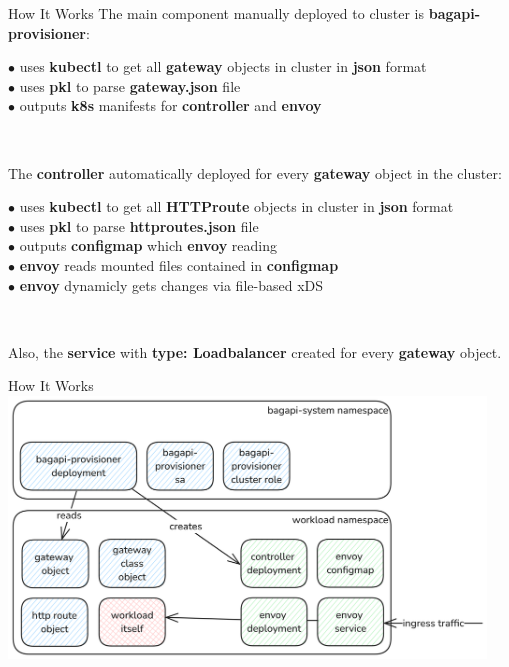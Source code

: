 \documentclass[11pt, aspectratio=169]{beamer}
\begin{document}
\begin{frame}{ How It Works}
	The main component manually deployed to cluster is \textbf{bagapi-provisioner}:

	\begin{description}
		\item [$\bullet$ uses \textbf{kubectl} to get all \textbf{gateway} objects in cluster in \textbf{json} format]
		\item [$\bullet$ uses \textbf{pkl} to parse \textbf{gateway.json} file]
		\item [$\bullet$ outputs \textbf{k8s} manifests for \textbf{controller} and \textbf{envoy}]
	\end{description}~

	The \textbf{controller} automatically deployed for every \textbf{gateway} object in the cluster:

	\begin{description}
		\item [$\bullet$ uses \textbf{kubectl} to get all \textbf{HTTProute} objects in cluster in \textbf{json} format]
		\item [$\bullet$ uses \textbf{pkl} to parse \textbf{httproutes.json} file]
		\item [$\bullet$ outputs \textbf{configmap} which \textbf{envoy} reading]
		\item [$\bullet$ \textbf{envoy} reads mounted files contained in \textbf{configmap}]
		\item [$\bullet$ \textbf{envoy} dynamicly gets changes via file-based xDS]
	\end{description}~

	Also, the \textbf{service} with \textbf{type: Loadbalancer} created for every \textbf{gateway} object.
\end{frame}

\begin{frame}[label=demopicture]{ How It Works}
	\includegraphics[width=0.95\textwidth]{scheme.png}
\end{frame}
\end{document}
